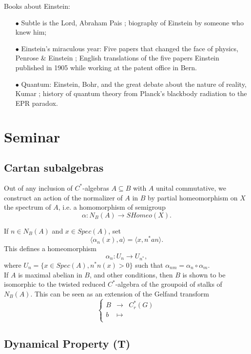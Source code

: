Books about Einstein: 
\begin{itemize}
\item[$\bullet$] Subtle is the Lord, Abraham Pais \cite{Pais1982}; biography of Einstein by someone who knew him;
\item[$\bullet$] Einstein's miraculous year: Five papers that changed the face of physics, Penrose \& Einstein \cite{Penrose2005Einstein}; English translations of the five papers Einstein published in 1905 while working at the patent office in Bern.  
\item[$\bullet$] Quantum: Einstein, Bohr, and the great debate about the nature of reality, Kumar \cite{Kumar}; history of quantum theory from Planck's blackbody radiation to the EPR paradox.
\end{itemize}
\section{Seminar}

\subsection{Cartan subalgebras}

Out of any inclusion of $C^*$-algebras $A\subseteq B$ with $A$ unital commutative, we construct an action of the normalizer of $A$ in $B$ by partial homeomorphism on $X$ the spectrum of $A$, i.e. a homomorphism of semigroup  
\[\alpha: N_B(A) \rightarrow SHomeo(X).\] 

If $n\in N_B(A)$ and $x\in Spec(A)$, set 
\[\langle \alpha_n(x) , a\rangle =\langle x , n^*a n\rangle .\]
This defines a homeomorphism 
\[\alpha_n : U_n \rightarrow U_{n^*},\]
where $U_n = \{x\in Spec(A), n^*n(x) >0\}$ such that $\alpha_{nm} =\alpha_{n} \circ \alpha_{m}$.\\
 
If $A$ is maximal abelian in $B$, and other conditions, then $B$ is shown to be isomorphic to the twisted reduced $C^*$-algebra of the groupoid of stalks of $N_B(A)$. This can be seen  as an extension of the Gelfand transform
\[\left\{\begin{array}{rcl}
B & \rightarrow & C^*_r(G) \\
b & \mapsto &  \\
\end{array}\right.\] 

\subsection{Dynamical Property (T)}

